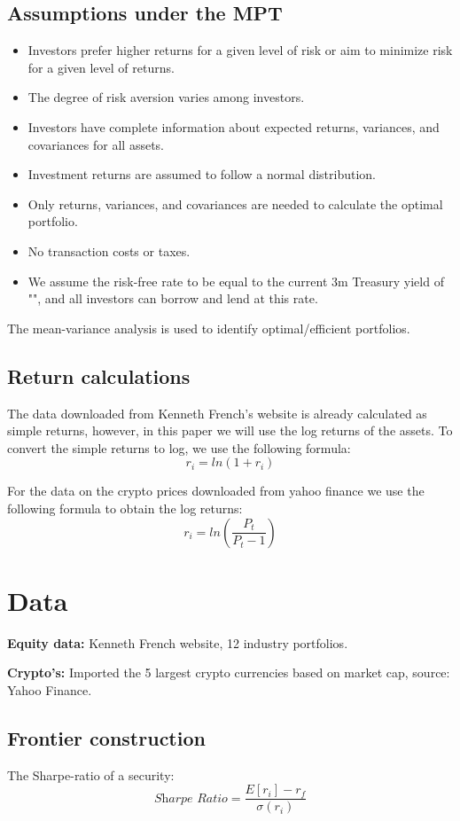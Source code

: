 \documentclass[12pt,a4paper]{article}
\begin{document}
\subsection{Assumptions under the MPT}
\begin{itemize}
\item Investors prefer higher returns for a given level of risk or aim to minimize risk for a given level of returns.
\item The degree of risk aversion varies among investors.
\item Investors have complete information about expected returns, variances, and covariances for all assets.
\item Investment returns are assumed to follow a normal distribution.
\item Only returns, variances, and covariances are needed to calculate the optimal portfolio.
\item No transaction costs or taxes.
\item We assume the risk-free rate to be equal to the current 3m Treasury yield of "", and all investors can borrow and lend at this rate. 
\end{itemize}
The mean-variance analysis is used to identify optimal/efficient portfolios.

\subsection{Return calculations}
The data downloaded from Kenneth French's website is already calculated as simple returns, however, in this paper we will use the log returns of the assets. To convert the simple returns to log, we use the following formula: 
$$r_i = ln(1+r_i)$$

\noindent For the data on the crypto prices downloaded from yahoo finance we use the following formula to obtain the log returns: 
$$r_i = ln(\frac{P_t}{P_t-1})$$

\section{Data}\label{sec:result}
\textbf{Equity data:} Kenneth French website, 12 industry portfolios. 

\noindent\textbf{Crypto's:} Imported the 5 largest crypto currencies based on market cap, source: Yahoo Finance.  

\subsection{Frontier construction}
The Sharpe-ratio of a security: 
$$\textit{Sharpe Ratio} = \frac{E[r_i] - r_f}{\sigma(r_i)}$$
\end{document}
